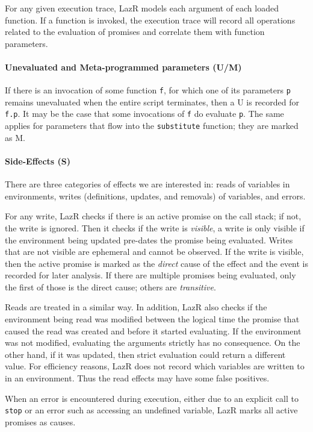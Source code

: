\documentclass[review,creen,acmsmall]{acmart}
\renewcommand{\c}[1]{\lstinline |#1|\xspace}
\newcommand{\lazr}{{\sf LazR}\xspace}
\begin{document}
For any given execution trace, \lazr models each argument of each loaded
function. If a function is invoked, the execution trace will record all
operations related to the evaluation of promises and correlate them with
function parameters.

\paragraph{Unevaluated and Meta-programmed parameters (U/M)}
If there is an invocation of some function \c f, for which one of its parameters
\c p remains unevaluated when the entire script terminates, then a U is recorded
for \c{f.p}. It may be the case that some invocations of \c f do evaluate \c p.
The same applies for parameters that flow into the \c{substitute} function; they
are marked as M.

\paragraph{Side-Effects (S)}
There are three categories of effects we are interested in: reads of variables
in environments, writes (definitions, updates, and removals) of variables, and
errors.

For any write, \lazr checks if there is an active promise on the call stack; if
not, the write is ignored. Then it checks if the write is \emph{visible}, a
write is only visible if the environment being updated pre-dates the promise
being evaluated. Writes that are not visible are ephemeral and cannot be
observed. If the write is visible, then the active promise is marked as the
\emph{direct} cause of the effect and the event is recorded for later analysis.
If there are multiple promises being evaluated, only the first of those is the
direct cause; others are \emph{transitive}.

Reads are treated in a similar way. In addition, \lazr also checks if the
environment being read was modified between the logical time the promise that
caused the read was created and before it started evaluating. If the environment
was not modified, evaluating the arguments strictly has no consequence. On the
other hand, if it was updated, then strict evaluation could return a different
value.
For efficiency reasons, \lazr does not record which variables are written
to in an environment. Thus the read effects may have some false positives.

When an error is encountered during execution, either due to an explicit call to
\c{stop} or an error such as accessing an undefined variable, \lazr marks all
active promises as causes.
\end{document}
